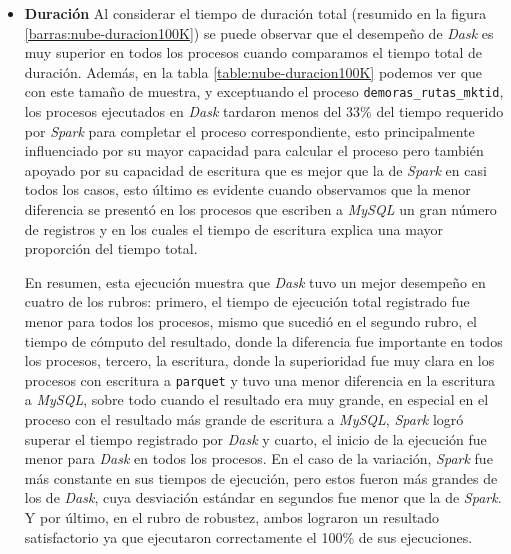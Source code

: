 \begin{itemize}
	\item \textbf{Duración} Al considerar el tiempo de duración total (resumido en la figura \ref{barras:nube-duracion100K}) se puede observar que el desempeño de \textit{Dask} es muy superior en todos los procesos cuando comparamos el tiempo total de duración. Además, en la tabla \ref{table:nube-duracion100K} podemos ver que con este tamaño de muestra, y exceptuando el proceso \texttt{demoras\_rutas\_mktid}, los procesos ejecutados en \textit{Dask} tardaron menos del 33\% del tiempo requerido por \textit{Spark} para completar el proceso correspondiente, esto principalmente influenciado por su mayor capacidad para calcular el proceso pero también apoyado por su capacidad de escritura que es mejor que la de \textit{Spark} en casi todos los casos, esto último es evidente cuando observamos que la menor diferencia se presentó en los procesos que escriben a \textit{MySQL} un gran número de registros y en los cuales el tiempo de escritura explica una mayor proporción del tiempo total.
	
En resumen, esta ejecución muestra que \textit{Dask} tuvo un mejor desempeño en cuatro de los rubros: primero, el tiempo de ejecución total registrado fue menor para todos los procesos, mismo que sucedió en el segundo rubro, el tiempo de cómputo del resultado, donde la diferencia fue importante en todos los procesos, tercero, la escritura, donde la superioridad fue muy clara en los procesos con escritura a \texttt{parquet} y tuvo una menor diferencia en la escritura a \textit{MySQL}, sobre todo cuando el resultado era muy grande, en especial en el proceso con el resultado más grande de escritura a \textit{MySQL}, \textit{Spark} logró superar el tiempo registrado por \textit{Dask} y cuarto, el inicio de la ejecución fue menor para \textit{Dask} en todos los procesos. En el caso de la variación, \textit{Spark} fue más constante en sus tiempos de ejecución, pero estos fueron más grandes de los de \textit{Dask}, cuya desviación estándar en segundos fue menor que la de \textit{Spark}. Y por último, en el rubro de robustez, ambos lograron un resultado satisfactorio ya que ejecutaron correctamente el 100\% de sus ejecuciones.
	
\end{itemize}


